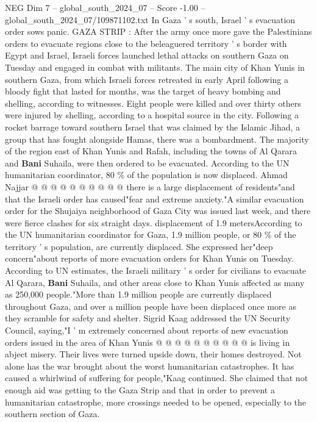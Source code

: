 \begin{textsample}{NEG Dim 7 – global\_south\_2024\_07 – Score -1.00 – global\_south\_2024\_07/109871102.txt}  \label{ex:f7_neg_348}
In Gaza ' s south, Israel ' s evacuation order sows panic.
GAZA STRIP : After the army once more gave the Palestinians orders to evacuate regions close to the beleaguered territory ' s border with Egypt and Israel, Israeli forces launched lethal attacks on southern Gaza on Tuesday and engaged in combat with militants.
The main city of Khan Yunis in southern Gaza, from which Israeli forces retreated in early April following a bloody fight that lasted for months, was the target of heavy bombing and shelling, according to witnesses.
Eight people were killed and over thirty others were injured by shelling, according to a hospital source in the city.
Following a rocket barrage toward southern Israel that was claimed by the Islamic Jihad, a group that has fought alongside Hamas, there was a bombardment.
The majority of the region east of Khan Yunis and Rafah, including the towns of Al Qarara and \textbf{Bani} Suhaila, were then ordered to be evacuated.
According to the UN humanitarian coordinator, 80 \% of the population is now displaced.
Ahmad Najjar @ @ @ @ @ @ @ @ @ @ there is a large displacement of residents"and that the Israeli order has caused"fear and extreme anxiety."A similar evacuation order for the Shujaiya neighborhood of Gaza City was issued last week, and there were fierce clashes for six straight days. displacement of 1.9 metersAccording to the UN humanitarian coordinator for Gaza, 1.9 million people, or 80 \% of the territory ' s population, are currently displaced.
She expressed her"deep concern"about reports of more evacuation orders for Khan Yunis on Tuesday.
According to UN estimates, the Israeli military ' s order for civilians to evacuate Al Qarara, \textbf{Bani} Suhaila, and other areas close to Khan Yunis affected as many as 250,000 people."More than 1.9 million people are currently displaced throughout Gaza, and over a million people have been displaced once more as they scramble for safety and shelter.
Sigrid Kaag addressed the UN Security Council, saying,"I ' m extremely concerned about reports of new evacuation orders issued in the area of Khan Yunis @ @ @ @ @ @ @ @ @ @ is living in abject misery.
Their lives were turned upside down, their homes destroyed.
Not alone has the war brought about the worst humanitarian catastrophes.
It has caused a whirlwind of suffering for people,"Kaag continued.
She claimed that not enough aid was getting to the Gaza Strip and that in order to prevent a humanitarian catastrophe, more crossings needed to be opened, especially to the southern section of Gaza.

\end{textsample}

